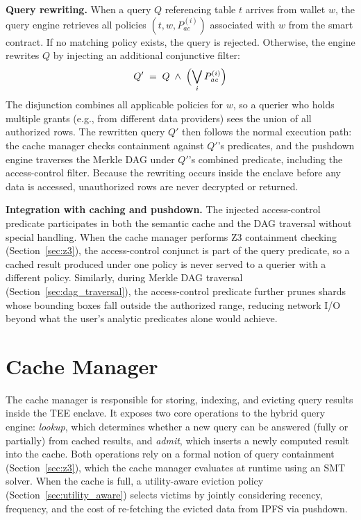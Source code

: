 \textbf{Query rewriting.}
When a query $Q$ referencing table $t$ arrives from wallet $w$, the query engine retrieves all policies $(t, w, P_{\mathit{ac}}^{(i)})$ associated with $w$ from the smart contract. If no matching policy exists, the query is rejected. Otherwise, the engine rewrites $Q$ by injecting an additional conjunctive filter:
\begin{equation}
    Q' \;=\; Q \;\wedge\; \Bigl(\bigvee_{i} P_{\mathit{ac}}^{(i)}\Bigr)
    \label{eq:rewrite}
\end{equation}
The disjunction combines all applicable policies for $w$, so a querier who holds multiple grants (e.g., from different data providers) sees the union of all authorized rows. The rewritten query $Q'$ then follows the normal execution path: the cache manager checks containment against $Q'$'s predicates, and the pushdown engine traverses the Merkle DAG under $Q'$'s combined predicate, including the access-control filter. Because the rewriting occurs inside the enclave before any data is accessed, unauthorized rows are never decrypted or returned.

\textbf{Integration with caching and pushdown.}
The injected access-control predicate participates in both the semantic cache and the DAG traversal without special handling. When the cache manager performs Z3 containment checking (Section~\ref{sec:z3}), the access-control conjunct is part of the query predicate, so a cached result produced under one policy is never served to a querier with a different policy. Similarly, during Merkle DAG traversal (Section~\ref{sec:dag_traversal}), the access-control predicate further prunes shards whose bounding boxes fall outside the authorized range, reducing network I/O beyond what the user's analytic predicates alone would achieve.

\section{Cache Manager}
\label{sec:cache}

The cache manager is responsible for storing, indexing, and evicting query results inside the TEE enclave.
It exposes two core operations to the hybrid query engine: \emph{lookup}, which determines whether a new query can be answered (fully or partially) from cached results, and \emph{admit}, which inserts a newly computed result into the cache.
Both operations rely on a formal notion of query containment (Section~\ref{sec:z3}), which the cache manager evaluates at runtime using an SMT solver.
When the cache is full, a utility-aware eviction policy (Section~\ref{sec:utility_aware}) selects victims by jointly considering recency, frequency, and the cost of re-fetching the evicted data from IPFS via pushdown.


